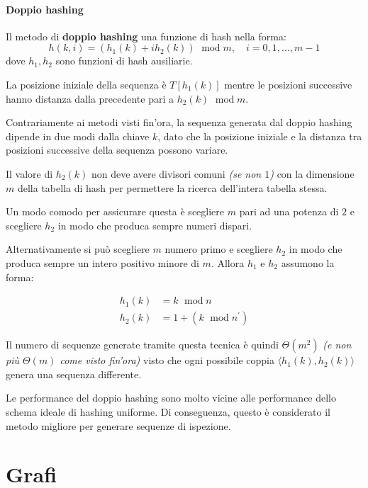 \documentclass[italian, 10pt]{article}
\DeclareMathOperator{\modop}{\ mod}
\begin{document}
\paragraph{Doppio hashing}

Il metodo di \textbf{doppio hashing} una funzione di hash nella forma:
\[ h(k, i) = \left(h_1(k) + i h_2(k)\right) \modop m, \quad i = 0, 1, \ldots, m-1 \]
dove \(h_1, h_2\) sono funzioni di hash ausiliarie.

La posizione iniziale della sequenza è \(T\left[h_1(k)\right]\) mentre le posizioni successive hanno distanza dalla precedente pari a \(h_2(k) \modop m\).

\bigskip
Contrariamente ai metodi visti fin'ora, la sequenza generata dal doppio hashing dipende in due modi dalla chiave \(k\), dato che la posizione iniziale e la distanza tra posizioni successive della sequenza possono variare.

Il valore di \(h_2(k)\) non deve avere divisori comuni \textit{(se non \(1\))} con la dimensione \(m\) della tabella di hash per permettere la ricerca dell'intera tabella stessa.

Un modo comodo per assicurare questa è scegliere \(m\) pari ad una potenza di \(2\) e scegliere \(h_2\) in modo che produca sempre numeri dispari.

Alternativamente si può scegliere \(m\) numero primo e scegliere \(h_2\) in modo che produca sempre un intero positivo minore di \(m\).
Allora \(h_1\) e \(h_2\) assumono la forma:

\begin{align*}
  h_1(k) & = k \modop n                         \\
  h_2(k) & = 1 + \left(k \modop n^\prime\right)
\end{align*}

\bigskip
Il numero di sequenze generate tramite questa tecnica è quindi \(\Theta(m^2)\) \textit{(e non più \(\Theta(m)\) come visto fin'ora)} visto che ogni possibile coppia \(\langle h_1(k), h_2(k) \rangle\) genera una sequenza differente.

Le performance del doppio hashing sono molto vicine alle performance dello schema ideale di hashing uniforme.
Di conseguenza, questo è considerato il metodo migliore per generare sequenze di ispezione.

\clearpage

\section{Grafi}
\label{sec:grafi}
\end{document}
